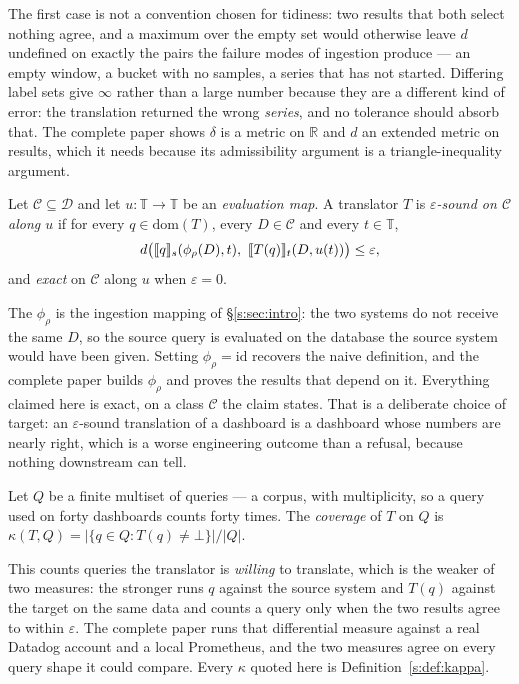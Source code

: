 \noindent
The first case is not a convention chosen for tidiness: two results that both select
nothing agree, and a maximum over the empty set would otherwise leave $d$ undefined on
exactly the pairs the failure modes of ingestion produce --- an empty window, a bucket
with no samples, a series that has not started. Differing label sets give $\infty$ rather
than a large number because they are a different kind of error: the translation returned
the wrong \emph{series}, and no tolerance should absorb that. The complete paper shows
$\delta$ is a metric on $\mathbb{R}$ and $d$ an extended metric on results, which it
needs because its admissibility argument is a triangle-inequality argument.

\begin{definition}\label{s:def:sound}
Let $\mathcal{C}\subseteq\mathcal{D}$ and let $u:\mathbb{T}\to\mathbb{T}$ be an
\emph{evaluation map}. A translator $T$ is \emph{$\varepsilon$-sound on $\mathcal{C}$
along $u$} if for every $q\in\mathrm{dom}(T)$, every $D\in\mathcal{C}$ and every
$t\in\mathbb{T}$,
\[
d\big(\sem{q}_s(\phi_\rho(D),t),\ \sem{T(q)}_t(D,u(t))\big)\le\varepsilon,
\]
and \emph{exact} on $\mathcal{C}$ along $u$ when $\varepsilon=0$.
\end{definition}

\noindent
The $\phi_\rho$ is the ingestion mapping of \S\ref{s:sec:intro}: the two systems do not
receive the same $D$, so the source query is evaluated on the database the source system
would have been given. Setting $\phi_\rho=\mathrm{id}$ recovers the naive definition, and
the complete paper builds $\phi_\rho$ and proves the results that depend on it.
Everything claimed here is exact, on a class $\mathcal{C}$ the claim states. That is a
deliberate choice of target: an $\varepsilon$-sound translation of a dashboard is a
dashboard whose numbers are nearly right, which is a worse engineering outcome than a
refusal, because nothing downstream can tell.

\begin{definition}[Coverage]\label{s:def:kappa}
Let $Q$ be a finite multiset of queries --- a corpus, with multiplicity, so a query used
on forty dashboards counts forty times. The \emph{coverage} of $T$ on $Q$ is
$\kappa(T,Q)=|\{q\in Q : T(q)\neq\bot\}|/|Q|$.
\end{definition}

\noindent
This counts queries the translator is \emph{willing} to translate, which is the weaker of
two measures: the stronger runs $q$ against the source system and $T(q)$ against the
target on the same data and counts a query only when the two results agree to within
$\varepsilon$. The complete paper runs that differential measure against a real Datadog
account and a local Prometheus, and the two measures agree on every query shape it could
compare. Every $\kappa$ quoted here is Definition~\ref{s:def:kappa}.
